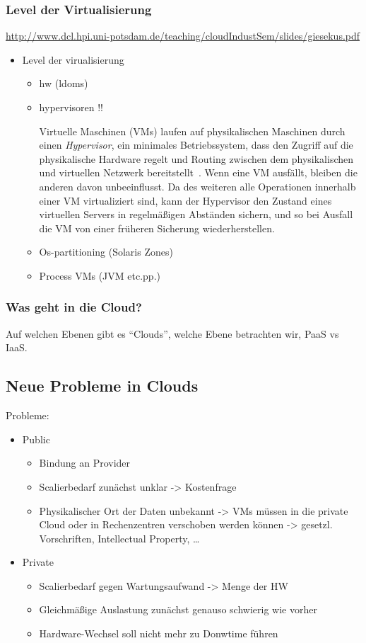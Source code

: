 \documentclass[draft,journal]{IEEEtran}
\begin{document}
\subsubsection{Level der Virtualisierung}
\label{sec:def-virtualisierung}
\url{http://www.dcl.hpi.uni-potsdam.de/teaching/cloudIndustSem/slides/giesekus.pdf}
\begin{itemize}
\item Level der virualisierung
  \begin{itemize}
  \item hw (ldoms)
  \item hypervisoren !!
    
    Virtuelle Maschinen (VMs) laufen auf physikalischen Maschinen durch
    einen \emph{Hypervisor}, ein minimales Betriebssystem, dass den
    Zugriff auf die physikalische Hardware regelt und Routing zwischen dem
    physikalischen und virtuellen Netzwerk
    bereitstellt~\cite{tanenbaum1992modern}. Wenn eine VM ausfällt,
    bleiben die anderen davon unbeeinflusst. Da des weiteren alle
    Operationen innerhalb einer VM virtualiziert sind, kann der Hypervisor
    den Zustand eines virtuellen Servers in regelmäßigen Abständen
    sichern, und so bei Ausfall die VM von einer früheren Sicherung
    wiederherstellen.

  \item Os-partitioning (Solaris Zones)
  \item Process VMs (JVM etc.pp.)
  \end{itemize}
\end{itemize}

\subsubsection{Was geht in die Cloud?}
Auf welchen Ebenen gibt es "`Clouds"', welche Ebene betrachten wir,
PaaS vs IaaS.

\subsection{Neue Probleme in Clouds}
Probleme:
\begin{itemize}
\item Public
  \begin{itemize}
  \item Bindung an Provider
  \item Scalierbedarf zunächst unklar -> Kostenfrage
  \item Physikalischer Ort der Daten unbekannt -> VMs müssen in die
    private Cloud oder in Rechenzentren verschoben werden können ->
    gesetzl. Vorschriften, Intellectual Property, \ldots
  \end{itemize}
\item Private
  \begin{itemize}
  \item Scalierbedarf gegen Wartungsaufwand -> Menge der HW
  \item Gleichmäßige Auslastung zunächst genauso schwierig wie vorher
  \item Hardware-Wechsel soll nicht mehr zu Donwtime führen
  \end{itemize}
\end{itemize}
\end{document}
